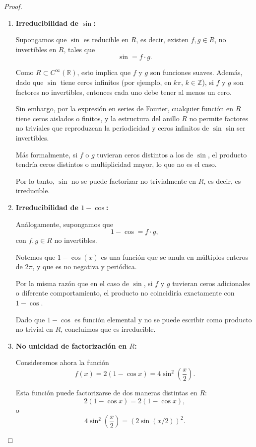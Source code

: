 \begin{ejemplo}
{\begin{enumerate}
\begin{proof}
			\begin{enumerate}
				\item \textbf{Irreducibilidad de \(\sin\):}
				
				Supongamos que \(\sin\) es reducible en \(R\), es decir, existen \(f, g \in R\), no invertibles en \(R\), tales que
				\[
				\sin = f \cdot g.
				\]
				
				Como \(R \subset C^\infty(\mathbb{R})\), esto implica que \(f\) y \(g\) son funciones suaves. 
				Además, dado que \(\sin\) tiene ceros infinitos (por ejemplo, en \(k\pi\), \(k \in \mathbb{Z}\)), si \(f\) y \(g\) son factores no invertibles, entonces cada uno debe tener al menos un cero.
				
				Sin embargo, por la expresión en series de Fourier, cualquier función en \(R\) tiene ceros aislados o finitos, y la estructura del anillo \(R\) no permite factores no triviales que reproduzcan la periodicidad y ceros infinitos de \(\sin\) sin ser invertibles.
				
				Más formalmente, si \(f\) o \(g\) tuvieran ceros distintos a los de \(\sin\), el producto tendría ceros distintos o multiplicidad mayor, lo que no es el caso.
				
				Por lo tanto, \(\sin\) no se puede factorizar no trivialmente en \(R\), es decir, es irreducible.
				
				\item \textbf{Irreducibilidad de \(1 - \cos\):}
				
				Análogamente, supongamos que
				\[
				1 - \cos = f \cdot g,
				\]
				con \(f, g \in R\) no invertibles.
				
				Notemos que \(1 - \cos(x)\) es una función que se anula en múltiplos enteros de \(2\pi\), y que es no negativa y periódica.
				
				Por la misma razón que en el caso de \(\sin\), si \(f\) y \(g\) tuvieran ceros adicionales o diferente comportamiento, el producto no coincidiría exactamente con \(1 - \cos\).
				
				Dado que \(1 - \cos\) es función elemental y no se puede escribir como producto no trivial en \(R\), concluimos que es irreducible.
				
				\item \textbf{No unicidad de factorización en \(R\):}
				
				Consideremos ahora la función
				\[
				f(x) = 2(1 - \cos x) = 4 \sin^2\left(\frac{x}{2}\right).
				\]
				
				Esta función puede factorizarse de dos maneras distintas en \(R\):
				\[
				2(1 - \cos x) = 2(1 - \cos x),
				\]
				o
				\[
				4 \sin^2\left(\frac{x}{2}\right) = (2 \sin(x/2))^2.
				\]
				

\end{enumerate}
\end{proof}
\end{enumerate}}
\end{ejemplo}
